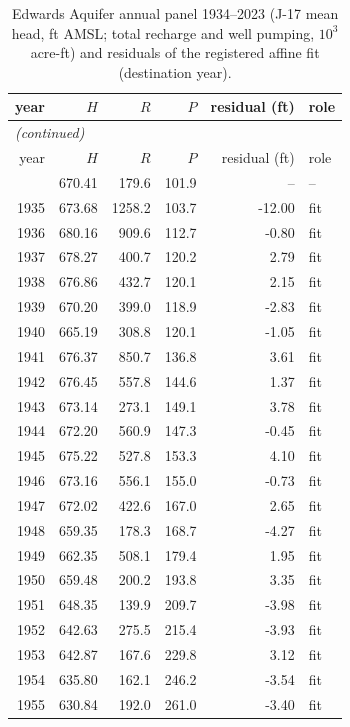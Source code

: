\begingroup\footnotesize\setlength{\tabcolsep}{3pt}
\begin{longtable}{rrrrrl}
\caption{Edwards Aquifer annual panel 1934--2023 (J-17 mean head, ft AMSL; total recharge and well pumping, $10^3$ acre-ft) and residuals of the registered affine fit (destination year).}\label{tab:si-edw-data}\\
\toprule
year & $H$ & $R$ & $P$ & residual (ft) & role \\
\midrule
\endfirsthead
\multicolumn{6}{l}{\emph{(continued)}}\\
\toprule
year & $H$ & $R$ & $P$ & residual (ft) & role \\
\midrule
\endhead
\bottomrule
\endfoot
1934 & 670.41 & 179.6 & 101.9 & -- & -- \\
1935 & 673.68 & 1258.2 & 103.7 & -12.00 & fit \\
1936 & 680.16 & 909.6 & 112.7 & -0.80 & fit \\
1937 & 678.27 & 400.7 & 120.2 & 2.79 & fit \\
1938 & 676.86 & 432.7 & 120.1 & 2.15 & fit \\
1939 & 670.20 & 399.0 & 118.9 & -2.83 & fit \\
1940 & 665.19 & 308.8 & 120.1 & -1.05 & fit \\
1941 & 676.37 & 850.7 & 136.8 & 3.61 & fit \\
1942 & 676.45 & 557.8 & 144.6 & 1.37 & fit \\
1943 & 673.14 & 273.1 & 149.1 & 3.78 & fit \\
1944 & 672.20 & 560.9 & 147.3 & -0.45 & fit \\
1945 & 675.22 & 527.8 & 153.3 & 4.10 & fit \\
1946 & 673.16 & 556.1 & 155.0 & -0.73 & fit \\
1947 & 672.02 & 422.6 & 167.0 & 2.65 & fit \\
1948 & 659.35 & 178.3 & 168.7 & -4.27 & fit \\
1949 & 662.35 & 508.1 & 179.4 & 1.95 & fit \\
1950 & 659.48 & 200.2 & 193.8 & 3.35 & fit \\
1951 & 648.35 & 139.9 & 209.7 & -3.98 & fit \\
1952 & 642.63 & 275.5 & 215.4 & -3.93 & fit \\
1953 & 642.87 & 167.6 & 229.8 & 3.12 & fit \\
1954 & 635.80 & 162.1 & 246.2 & -3.54 & fit \\
1955 & 630.84 & 192.0 & 261.0 & -3.40 & fit \\

\end{longtable}
